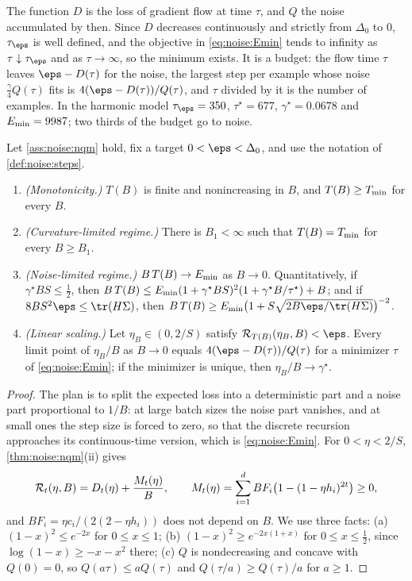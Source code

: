 \begin{refsection}
The function $D$ is the loss of gradient flow at time $\tau$, and $Q$ the noise accumulated by then. Since $D$ decreases continuously and strictly from $\Delta_0$ to $0$, $\tau_\eps$ is well defined, and the objective in \eqref{eq:noise:Emin} tends to infinity as $\tau\downarrow\tau_\eps$ and as $\tau\to\infty$, so the minimum exists. It is a budget: the flow time $\tau$ leaves $\eps-D(\tau)$ for the noise, the largest step per example whose noise $\frac\gamma4Q(\tau)$ fits is $4(\eps-D(\tau))/Q(\tau)$, and $\tau$ divided by it is the number of examples. In the harmonic model $\tau_\eps=350$, $\tau^\star=677$, $\gamma^\star=0.0678$ and $E_{\min}=9987$; two thirds of the budget go to noise.

\begin{theorem}\label{thm:noise:critical}
Let \cref{ass:noise:nqm} hold, fix a target $0<\eps<\Delta_0$, and use the notation of \cref{def:noise:steps}.
\begin{enumerate}
\item \emph{(Monotonicity.)} $T(B)$ is finite and nonincreasing in $B$, and $T(B)\ge T_{\min}$ for every $B$.
\item \emph{(Curvature-limited regime.)} There is $B_1<\infty$ such that $T(B)=T_{\min}$ for every $B\ge B_1$.
\item \emph{(Noise-limited regime.)} $B\,T(B)\to E_{\min}$ as $B\to0$. Quantitatively, if $\gamma^\star BS\le\frac12$, then $B\,T(B)\le E_{\min}(1+\gamma^\star BS)^2(1+\gamma^\star B/\tau^\star)+B$; and if $8BS^2\eps\le\tr(H\Sigma)$, then $B\,T(B)\ge\noiseEmin\bigl(1+S\sqrt{2B\eps/\tr(H\Sigma)}\bigr)^{-2}$.
\item \emph{(Linear scaling.)} Let $\eta_B\in(0,2/S)$ satisfy $\cR_{T(B)}(\eta_B,B)<\eps$. Every limit point of $\eta_B/B$ as $B\to0$ equals $4(\eps-D(\tau))/Q(\tau)$ for a minimizer $\tau$ of \eqref{eq:noise:Emin}; if the minimizer is unique, then $\eta_B/B\to\gamma^\star$.
\end{enumerate}
\end{theorem}

\begin{proof}
The plan is to split the expected loss into a deterministic part and a noise part proportional to $1/B$: at large batch sizes the noise part vanishes, and at small ones the step size is forced to zero, so that the discrete recursion approaches its continuous-time version, which is \eqref{eq:noise:Emin}. For $0<\eta<2/S$, \cref{thm:noise:nqm}(ii) gives
\[
  \mathcal{R}_t(\eta,B)=D_t(\eta)+\frac{M_t(\eta)}B,\qquad M_t(\eta)=\sum_{i=1}^dBF_i\bigl(1-(1-\eta h_i)^{2t}\bigr)\ge0,
\]
and $BF_i=\eta c_i/(2(2-\eta h_i))$ does not depend on $B$. We use three facts: (a) $(1-x)^2\le e^{-2x}$ for $0\le x\le1$; (b) $(1-x)^2\ge e^{-2x(1+x)}$ for $0\le x\le\frac12$, since $\log(1-x)\ge-x-x^2$ there; (c) $Q$ is nondecreasing and concave with $Q(0)=0$, so $Q(a\tau)\le aQ(\tau)$ and $Q(\tau/a)\ge Q(\tau)/a$ for $a\ge1$.


\end{proof}
\end{refsection}
